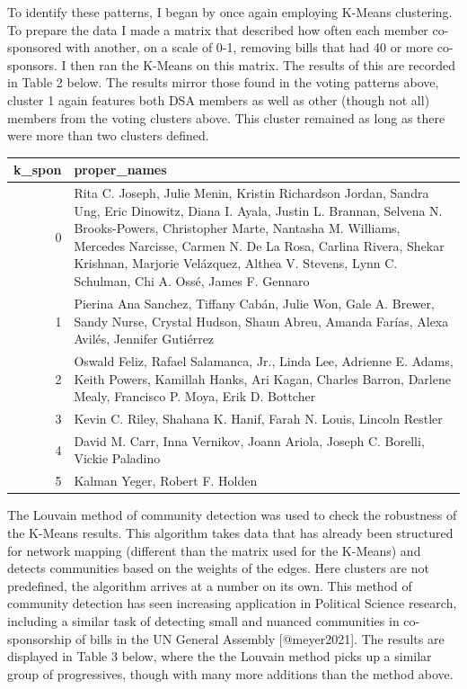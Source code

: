 \documentclass[
  letterpaper,
  DIV=11,
  numbers=noendperiod]{scrartcl}
\begin{document}
To identify these patterns, I began by once again employing K-Means
clustering. To prepare the data I made a matrix that described how often
each member co-sponsored with another, on a scale of 0-1, removing bills
that had 40 or more co-sponsors. I then ran the K-Means on this matrix.
The results of this are recorded in Table 2 below. The results mirror
those found in the voting patterns above, cluster 1 again features both
DSA members as well as other (though not all) members from the voting
clusters above. This cluster remained as long as there were more than
two clusters defined.

\begin{longtable}{rl}
\toprule
k\_spon & proper\_names \\ 
\midrule
0 & Rita C. Joseph, Julie Menin, Kristin Richardson Jordan, Sandra Ung, Eric Dinowitz, Diana I. Ayala, Justin L. Brannan, Selvena N. Brooks-Powers, Christopher Marte, Nantasha M. Williams, Mercedes Narcisse, Carmen N. De La Rosa, Carlina Rivera, Shekar Krishnan, Marjorie Velázquez, Althea V.  Stevens, Lynn C. Schulman, Chi A. Ossé, James F. Gennaro \\ 
1 & Pierina Ana Sanchez, Tiffany Cabán, Julie Won, Gale A. Brewer, Sandy Nurse, Crystal Hudson, Shaun Abreu, Amanda Farías, Alexa Avilés, Jennifer Gutiérrez \\ 
2 & Oswald Feliz, Rafael Salamanca, Jr., Linda Lee, Adrienne E. Adams, Keith Powers, Kamillah Hanks, Ari Kagan, Charles Barron, Darlene Mealy, Francisco P. Moya, Erik D. Bottcher \\ 
3 & Kevin C. Riley, Shahana K. Hanif, Farah N. Louis, Lincoln Restler \\ 
4 & David M. Carr, Inna Vernikov, Joann Ariola, Joseph C. Borelli, Vickie Paladino \\ 
5 & Kalman Yeger, Robert F. Holden \\ 
\bottomrule
\end{longtable}

The Louvain method of community detection was used to check the
robustness of the K-Means results. This algorithm takes data that has
already been structured for network mapping (different than the matrix
used for the K-Means) and detects communities based on the weights of
the edges. Here clusters are not predefined, the algorithm arrives at a
number on its own. This method of community detection has seen
increasing application in Political Science research, including a
similar task of detecting small and nuanced communities in
co-sponsorship of bills in the UN General Assembly {[}@meyer2021{]}. The
results are displayed in Table 3 below, where the the Louvain method
picks up a similar group of progressives, though with many more
additions than the method above.
\end{document}

